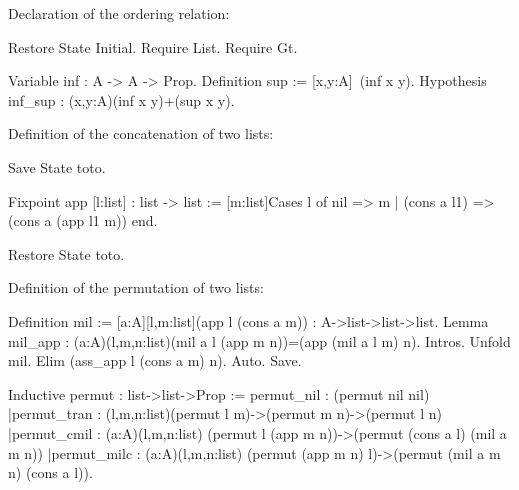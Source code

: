 Declaration of the ordering relation:
\begin{coq_eval}
Restore State Initial.
Require List.
Require Gt.
\end{coq_eval}
\begin{coq_example*}
Variable   inf : A -> A -> Prop.
Definition sup  := [x,y:A]~(inf x y).
Hypothesis inf_sup : (x,y:A){(inf x y)}+{(sup x y)}.
\end{coq_example*}
Definition of the concatenation of two lists:
\begin{coq_eval}
Save State toto.
\end{coq_eval}
\begin{coq_example*}
Fixpoint app [l:list] : list -> list 
      := [m:list]Cases l of
                   nil => m 
                 | (cons a l1) => (cons a (app l1 m)) end.
\end{coq_example*}
\begin{coq_eval}
Restore State toto.
\end{coq_eval}
Definition of the permutation of two lists:
\begin{coq_eval}
Definition mil := [a:A][l,m:list](app l (cons a m)) : A->list->list->list.
Lemma mil_app : (a:A)(l,m,n:list)(mil a l (app m n))=(app (mil a l m) n).
        Intros.
        Unfold mil.
        Elim (ass_app l (cons a m) n).
        Auto.
Save.
\end{coq_eval}
\begin{coq_example*}
Inductive permut : list->list->Prop :=
    permut_nil  : (permut nil nil)
   |permut_tran : (l,m,n:list)(permut l m)->(permut m n)->(permut l n)
   |permut_cmil : (a:A)(l,m,n:list)
         (permut l (app m n))->(permut (cons a l) (mil a m n))
   |permut_milc : (a:A)(l,m,n:list)
         (permut (app m n) l)->(permut (mil a m n) (cons a l)).
\end{coq_example*}
